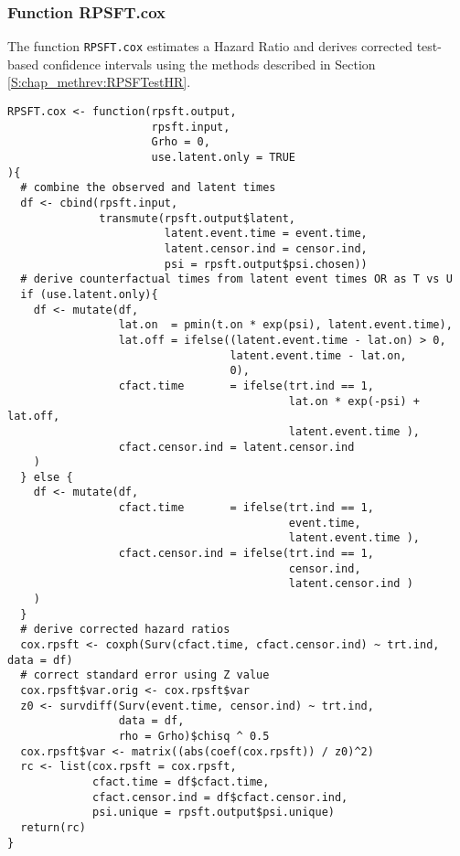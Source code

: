 \subsubsection{Function RPSFT.cox}
The function \verb+RPSFT.cox+ estimates a Hazard Ratio and derives corrected test-based confidence intervals using the methods described in Section \ref{S:chap_methrev:RPSFTestHR}.
\begin{Verbatim}[fontsize=\small, baselinestretch=0.75]
RPSFT.cox <- function(rpsft.output, 
                      rpsft.input, 
                      Grho = 0, 
                      use.latent.only = TRUE
){ 
  # combine the observed and latent times
  df <- cbind(rpsft.input, 
              transmute(rpsft.output$latent, 
                        latent.event.time = event.time, 
                        latent.censor.ind = censor.ind, 
                        psi = rpsft.output$psi.chosen))  
  # derive counterfactual times from latent event times OR as T vs U
  if (use.latent.only){
    df <- mutate(df,
                 lat.on  = pmin(t.on * exp(psi), latent.event.time),
                 lat.off = ifelse((latent.event.time - lat.on) > 0, 
                                  latent.event.time - lat.on, 
                                  0),
                 cfact.time       = ifelse(trt.ind == 1, 
                                           lat.on * exp(-psi) + lat.off,  
                                           latent.event.time ), 
                 cfact.censor.ind = latent.censor.ind
    )
  } else {
    df <- mutate(df, 
                 cfact.time       = ifelse(trt.ind == 1, 
                                           event.time,  
                                           latent.event.time ),
                 cfact.censor.ind = ifelse(trt.ind == 1, 
                                           censor.ind,  
                                           latent.censor.ind )
    )                 
  }  
  # derive corrected hazard ratios
  cox.rpsft <- coxph(Surv(cfact.time, cfact.censor.ind) ~ trt.ind, data = df)  
  # correct standard error using Z value
  cox.rpsft$var.orig <- cox.rpsft$var
  z0 <- survdiff(Surv(event.time, censor.ind) ~ trt.ind, 
                 data = df, 
                 rho = Grho)$chisq ^ 0.5
  cox.rpsft$var <- matrix((abs(coef(cox.rpsft)) / z0)^2)  
  rc <- list(cox.rpsft = cox.rpsft, 
             cfact.time = df$cfact.time, 
             cfact.censor.ind = df$cfact.censor.ind, 
             psi.unique = rpsft.output$psi.unique)  
  return(rc)  
}
\end{Verbatim}
\clearpage
\newpage

